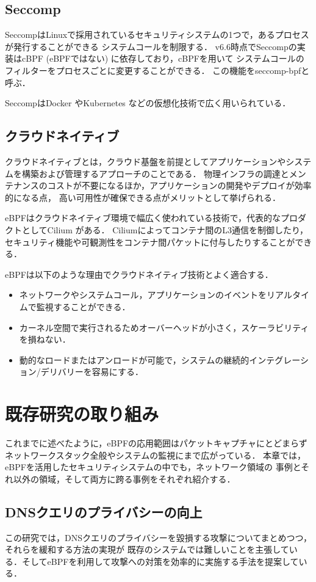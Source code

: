 \documentclass[platex,a4j,10pt,twoside,twocolumn,dvipdfmx]{jsarticle}
\begin{document}
\subsection{Seccomp}
SeccompはLinuxで採用されているセキュリティシステムの1つで，あるプロセスが発行することができる
システムコールを制限する．
v6.6時点でSeccompの実装はcBPF (eBPFではない) に依存しており，cBPFを用いて
システムコールのフィルターをプロセスごとに変更することができる．
この機能をseccomp-bpfと呼ぶ．

SeccompはDocker \cite{Seccomps57:online} やKubernetes\cite{Configur55:online} などの仮想化技術で広く用いられている．

\subsection{クラウドネイティブ}
クラウドネイティブとは，クラウド基盤を前提としてアプリケーションやシステムを構築および管理するアプローチのことである．
物理インフラの調達とメンテナンスのコストが不要になるほか，アプリケーションの開発やデプロイが効率的になる点，
高い可用性が確保できる点がメリットとして挙げられる．

eBPFはクラウドネイティブ環境で幅広く使われている技術で，代表的なプロダクトとしてCilium \cite{CiliumCl38:online}がある．
Ciliumによってコンテナ間のL3通信を制御したり，セキュリティ機能や可観測性をコンテナ間パケットに付与したりすることができる．

eBPFは以下のような理由でクラウドネイティブ技術とよく適合する．
\begin{itemize}
  \item ネットワークやシステムコール，アプリケーションのイベントをリアルタイムで監視することができる．
  \item カーネル空間で実行されるためオーバーヘッドが小さく，スケーラビリティを損ねない．
  \item 動的なロードまたはアンロードが可能で，システムの継続的インテグレーション/デリバリーを容易にする．
\end{itemize}

\section{既存研究の取り組み}
これまでに述べたように，eBPFの応用範囲はパケットキャプチャにとどまらず
ネットワークスタック全般やシステムの監視にまで広がっている．
本章では，eBPFを活用したセキュリティシステムの中でも，ネットワーク領域の
事例とそれ以外の領域，そして両方に跨る事例をそれぞれ紹介する．

\subsection{DNSクエリのプライバシーの向上 \cite{rivera2020leveraging}}
この研究では，DNSクエリのプライバシーを毀損する攻撃についてまとめつつ，それらを緩和する方法の実現が
既存のシステムでは難しいことを主張している．そしてeBPFを利用して攻撃への対策を効率的に実施する手法を提案している．
\end{document}

